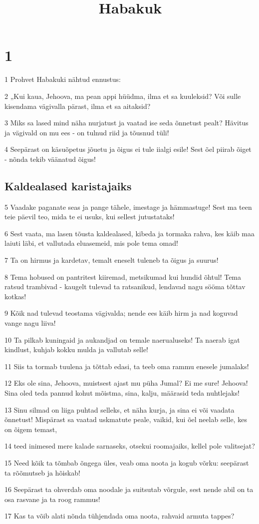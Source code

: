 

\title{Habakuk}

\chapter{1}

\par 1 Prohvet Habakuki nähtud ennustus:
\par 2 „Kui kaua, Jehoova, ma pean appi hüüdma, ilma et sa kuuleksid? Või sulle kisendama vägivalla pärast, ilma et sa aitaksid?
\par 3 Miks sa lased mind näha nurjatust ja vaatad ise seda õnnetust pealt? Hävitus ja vägivald on mu ees - on tulnud riid ja tõusnud tüli!
\par 4 Seepärast on käsuõpetus jõuetu ja õigus ei tule iialgi esile! Sest õel piirab õiget - nõnda tekib väänatud õigus!
\section*{Kaldealased karistajaiks}

\par 5 Vaadake paganate seas ja pange tähele, imestage ja hämmastuge! Sest ma teen teie päevil teo, mida te ei usuks, kui sellest jutustataks!
\par 6 Sest vaata, ma lasen tõusta kaldealased, kibeda ja tormaka rahva, kes käib maa laiuti läbi, et vallutada eluasemeid, mis pole tema omad!
\par 7 Ta on hirmus ja kardetav, temalt eneselt tuleneb ta õigus ja suurus!
\par 8 Tema hobused on pantritest kiiremad, metsikumad kui hundid õhtul! Tema ratsud trambivad - kaugelt tulevad ta ratsanikud, lendavad nagu sööma tõttav kotkas!
\par 9 Kõik nad tulevad teostama vägivalda; nende ees käib hirm ja nad koguvad vange nagu liiva!
\par 10 Ta pilkab kuningaid ja aukandjad on temale naerualuseks! Ta naerab igat kindlust, kuhjab kokku mulda ja vallutab selle!
\par 11 Siis ta tormab tuulena ja tõttab edasi, ta teeb oma rammu enesele jumalaks!
\par 12 Eks ole sina, Jehoova, muistsest ajast mu püha Jumal? Ei me sure! Jehoova! Sina oled teda pannud kohut mõistma, sina, kalju, määrasid teda nuhtlejaks!
\par 13 Sinu silmad on liiga puhtad selleks, et näha kurja, ja sina ei või vaadata õnnetust! Mispärast sa vaatad uskmatute peale, vaikid, kui õel neelab selle, kes on õigem temast,
\par 14 teed inimesed mere kalade sarnaseks, otsekui roomajaiks, kellel pole valitsejat?
\par 15 Need kõik ta tõmbab õngega üles, veab oma noota ja kogub võrku: seepärast ta rõõmutseb ja hõiskab!
\par 16 Seepärast ta ohverdab oma noodale ja suitsutab võrgule, sest nende abil on ta osa rasvane ja ta roog rammus!
\par 17 Kas ta võib alati nõnda tühjendada oma noota, rahvaid armuta tappes?


